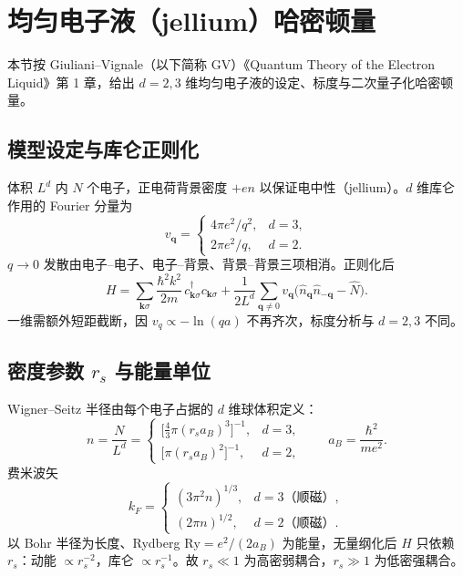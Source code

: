 \section{均匀电子液（jellium）哈密顿量}

本节按 Giuliani--Vignale（以下简称 GV）《Quantum Theory of the Electron Liquid》第 1 章，给出 $d=2,3$ 维均匀电子液的设定、标度与二次量子化哈密顿量。

\subsection{模型设定与库仑正则化}

体积 $L^d$ 内 $N$ 个电子，正电荷背景密度 $+en$ 以保证电中性（jellium）。$d$ 维库仑作用的 Fourier 分量为
\begin{equation}
  v_{\mathbf{q}}
  =
  \begin{cases}
    4\pi e^2/q^2, & d=3,\\
    2\pi e^2/q, & d=2.
  \end{cases}
\label{eq:vq_d}
\end{equation}
$q\to0$ 发散由电子--电子、电子--背景、背景--背景三项相消。正则化后
\begin{equation}
  H=\sum_{\mathbf{k}\sigma}
  \frac{\hbar^2k^2}{2m}\,
  c_{\mathbf{k}\sigma}^\dagger c_{\mathbf{k}\sigma}
  +\frac{1}{2L^d}\sum_{\mathbf{q}\neq0}
  v_{\mathbf{q}}
  \bigl(\hat n_{\mathbf{q}}\hat n_{-\mathbf{q}}-\hat N\bigr).
\label{eq:jelliumH}
\end{equation}
一维需额外短距截断，因 $v_q\propto -\ln(qa)$ 不再齐次，标度分析与 $d=2,3$ 不同。

\subsection{密度参数 \texorpdfstring{$r_s$}{rs} 与能量单位}

Wigner--Seitz 半径由每个电子占据的 $d$ 维球体积定义：
\begin{equation}
  n=\frac{N}{L^d}
  =
  \begin{cases}
    \bigl[\tfrac43\pi (r_s a_B)^3\bigr]^{-1}, & d=3,\\
    \bigl[\pi (r_s a_B)^2\bigr]^{-1}, & d=2,
  \end{cases}
  \qquad
  a_B=\frac{\hbar^2}{me^2}.
\end{equation}
费米波矢
\begin{equation}
  k_F
  =
  \begin{cases}
    (3\pi^2 n)^{1/3}, & d=3\text{（顺磁）},\\
    (2\pi n)^{1/2}, & d=2\text{（顺磁）}.
  \end{cases}
\end{equation}
以 Bohr 半径为长度、Rydberg $\mathrm{Ry}=e^2/(2a_B)$ 为能量，无量纲化后 $H$ 只依赖 $r_s$：动能 $\propto r_s^{-2}$，库仑 $\propto r_s^{-1}$。故 $r_s\ll1$ 为高密弱耦合，$r_s\gg1$ 为低密强耦合。

